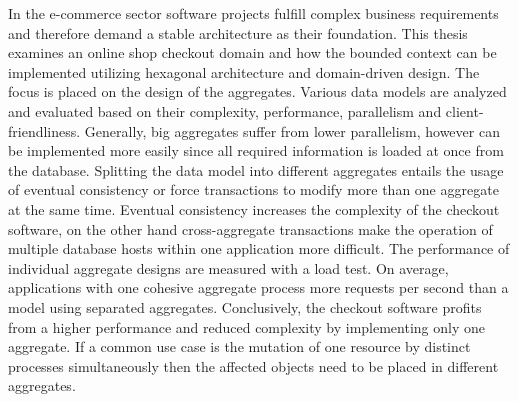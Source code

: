 {{{			In the e-commerce sector software projects fulfill complex business requirements and therefore demand a stable architecture as their foundation. This thesis examines an online shop checkout domain and how the bounded context can be implemented utilizing hexagonal architecture and domain-driven design. The focus is placed on the design of the aggregates. Various data models are analyzed and evaluated based on their complexity, performance, parallelism and client-friendliness. Generally, big aggregates suffer from lower parallelism, however can be implemented more easily since all required information is loaded at once from the database. Splitting the data model into different aggregates entails the usage of eventual consistency or force transactions to modify more than one aggregate at the same time. Eventual consistency increases the complexity of the checkout software, on the other hand cross-aggregate transactions make the operation of multiple database hosts within one application more difficult. The performance of individual aggregate designs are measured with a load test. On average, applications with one cohesive aggregate process more requests per second than a model using separated aggregates. Conclusively, the checkout software profits from a higher performance and reduced complexity by implementing only one aggregate. If a common use case is the mutation of one resource by distinct processes simultaneously then the affected objects need to be placed in different aggregates.
			
			\par}
		\vfill
	}
	
	
 	\pagebreak

	\large
	
	{
		\thispagestyle{plain}
		\vspace*{\fill}
		}}
